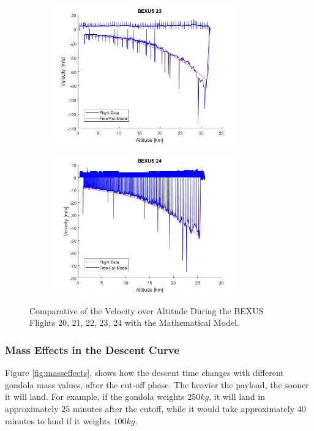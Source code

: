 \begin{figure}[H]
{\begin{subfigure}{0.45\textwidth}
    \centering\includegraphics[width=8cm]{appendix/img/velocity23mathmodel.png}
  \end{subfigure}}
  \centering
  \begin{subfigure}{0.45\textwidth}
    \centering\includegraphics[width=8cm]{appendix/img/velocity24mathmodel.png}
  \end{subfigure}
  \caption{Comparative of the Velocity over Altitude During the BEXUS Flights 20, 21, 22, 23, 24 with the Mathematical Model.}
  \end{figure}
  


\subsubsection{Mass Effects in the Descent Curve}

Figure \ref{fig:masseffects}, shows how the descent time changes with different gondola mass values, after the cut-off phase. The heavier the payload, the sooner it will land. For example, if the gondola weights $250 kg$, it will land in approximately $25$ minutes after the cutoff, while it would take approximately $40$ minutes to land if it weights $100 kg$.   

